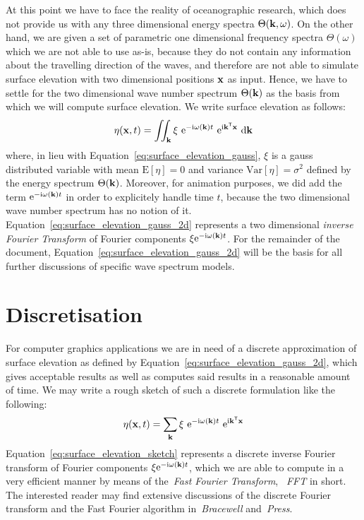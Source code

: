 At this point we have to face the reality of oceanographic research, which does 
not provide us with any three dimensional energy spectra 
$\Theta(\mathbf{k},\omega)$. On the other hand, we are given a set of 
parametric one dimensional frequency spectra $\Theta(\omega)$ which we are not 
able to use as-is, because they do not contain any information about the 
travelling direction of the waves, and therefore are not able to simulate 
surface elevation with two dimensional positions $\mathbf{x}$ as input. Hence, we 
have to settle for the two dimensional wave number spectrum $\Theta(\mathbf{k})$ 
as the basis from which we will compute surface elevation. We write surface 
elevation as follows:
\begin{equation}
\label{eq:surface_elevation_gauss_2d}
 \eta(\mathbf{x}, t) = \iint_{\mathbf{k}} 
\xi~\mathrm{e}^{-\mathrm{i}\omega(\mathbf{k}) t}
~\mathrm{e}^{\mathrm{i}\mathbf{k}^{\mathsf{T}}\mathbf{x}}~\mathrm{d}\mathbf{k}
\end{equation}
where, in lieu with Equation~\ref{eq:surface_elevation_gauss}, $\xi$ is 
a gauss distributed variable with mean $\mathrm{E}[\eta] = 0$ and
variance $\mathrm{Var}[\eta] = \sigma^2$ defined by the energy spectrum
$\Theta(\mathbf{k})$. Moreover, for animation purposes, we did add the term 
$\mathrm{e}^{-\mathrm{i}\omega(\mathbf{k}) t}$ in order to explicitely handle 
time $t$, because the two dimensional wave number spectrum has no notion of 
it. Equation~\ref{eq:surface_elevation_gauss_2d} represents a two dimensional 
\emph{inverse Fourier Transform} of Fourier components 
$\xi\mathrm{e}^{-\mathrm{i}\omega(\mathbf{k}) t}$. For the remainder of the 
document, Equation~\ref{eq:surface_elevation_gauss_2d} will be the basis for all 
further discussions of specific wave spectrum models.
%
\section{Discretisation}
For computer graphics applications we are in need of a discrete approximation 
of surface elevation as defined by 
Equation~\ref{eq:surface_elevation_gauss_2d}, 
which gives acceptable results as well as computes said results in a reasonable 
amount of time. We may write a rough sketch of such a discrete formulation like 
the following:
\begin{equation}
\label{eq:surface_elevation_sketch}
 \eta(\mathbf{x}, t) = \sum_{\mathbf{k}} 
\xi~\mathrm{e}^{-\mathrm{i}\omega(\mathbf{k}) t}
~\mathrm{e}^{\mathrm{i}\mathbf{k}^{\mathsf{T}}\mathbf{x}}
\end{equation}
Equation~\ref{eq:surface_elevation_sketch} represents a discrete inverse 
Fourier transform of Fourier components 
$\xi\mathrm{e}^{-\mathrm{i}\omega(\mathbf{k}) t}$, which we are able to compute in 
a very efficient manner by means of the~\emph{Fast Fourier Transform}, 
~\emph{FFT} in short. The interested reader may find extensive discussions of 
the discrete Fourier transform and the Fast Fourier algorithm
in~\emph{Bracewell}\cite{book:bracewell2000fourier} 
and~\emph{Press}\cite{book:numericalrecipes}.\\

